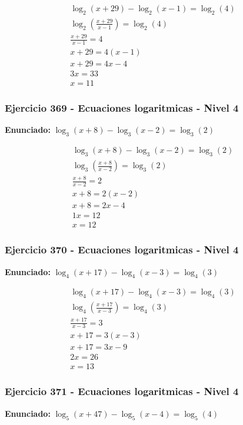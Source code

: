 \documentclass[12pt,a4paper]{article}
\begin{document}
\[
\begin{aligned}
\log_{2}\left(x+29\right) - \log_{2}\left(x-1\right)=\log_{2}\left(4\right)\\
\log_{2}\left(\frac{x+29}{x-1}\right)=\log_{2}\left(4\right)\\
\frac{x+29}{x-1}=4\\
x+29=4(x-1)\\
x+29=4x-4\\
3x=33\\
\boxed{x=11}
\end{aligned}
\]


\subsubsection*{Ejercicio 369 - Ecuaciones logaritmicas - Nivel 4}
\textbf{Enunciado:} \(\log_{3}\left(x+8\right) - \log_{3}\left(x-2\right)=\log_{3}\left(2\right)\)

\[
\begin{aligned}
\log_{3}\left(x+8\right) - \log_{3}\left(x-2\right)=\log_{3}\left(2\right)\\
\log_{3}\left(\frac{x+8}{x-2}\right)=\log_{3}\left(2\right)\\
\frac{x+8}{x-2}=2\\
x+8=2(x-2)\\
x+8=2x-4\\
1x=12\\
\boxed{x=12}
\end{aligned}
\]


\subsubsection*{Ejercicio 370 - Ecuaciones logaritmicas - Nivel 4}
\textbf{Enunciado:} \(\log_{4}\left(x+17\right) - \log_{4}\left(x-3\right)=\log_{4}\left(3\right)\)

\[
\begin{aligned}
\log_{4}\left(x+17\right) - \log_{4}\left(x-3\right)=\log_{4}\left(3\right)\\
\log_{4}\left(\frac{x+17}{x-3}\right)=\log_{4}\left(3\right)\\
\frac{x+17}{x-3}=3\\
x+17=3(x-3)\\
x+17=3x-9\\
2x=26\\
\boxed{x=13}
\end{aligned}
\]


\subsubsection*{Ejercicio 371 - Ecuaciones logaritmicas - Nivel 4}
\textbf{Enunciado:} \(\log_{5}\left(x+47\right) - \log_{5}\left(x-4\right)=\log_{5}\left(4\right)\)
\end{document}
